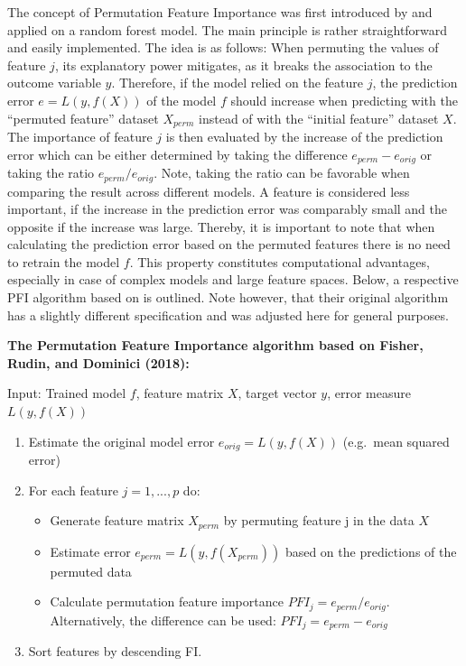 \documentclass[]{krantz}
\providecommand{\tightlist}{%
  \setlength{\itemsep}{0pt}\setlength{\parskip}{0pt}}
\begin{document}
The concept of Permutation Feature Importance was first introduced by
\citet{breiman2001random} and applied on a random forest model. The main
principle is rather straightforward and easily implemented. The idea is
as follows: When permuting the values of feature \(j\), its explanatory
power mitigates, as it breaks the association to the outcome variable
\(y\). Therefore, if the model relied on the feature \(j\), the
prediction error \(e = L(y,f(X))\) of the model \(f\) should increase
when predicting with the ``permuted feature'' dataset \(X_{perm}\)
instead of with the ``initial feature'' dataset \(X\). The importance of
feature \(j\) is then evaluated by the increase of the prediction error
which can be either determined by taking the difference
\(e_{perm} - e_{orig}\) or taking the ratio \(e_{perm}/e_{orig}\). Note,
taking the ratio can be favorable when comparing the result across
different models. A feature is considered less important, if the
increase in the prediction error was comparably small and the opposite
if the increase was large. Thereby, it is important to note that when
calculating the prediction error based on the permuted features there is
no need to retrain the model \(f\). This property constitutes
computational advantages, especially in case of complex models and large
feature spaces. Below, a respective PFI algorithm based on
\citet{fisher2018model} is outlined. Note however, that their original
algorithm has a slightly different specification and was adjusted here
for general purposes.

\textbf{The Permutation Feature Importance algorithm based on Fisher,
Rudin, and Dominici (2018):}

Input: Trained model \(f\), feature matrix \(X\), target vector \(y\),
error measure \(L(y,f(X))\)

\begin{enumerate}
\def\labelenumi{\arabic{enumi}.}
\tightlist
\item
  Estimate the original model error \(e_{orig} = L(y,f(X))\) (e.g.~mean
  squared error)
\item
  For each feature \(j = 1,...,p\) do:

  \begin{itemize}
  \tightlist
  \item
    Generate feature matrix \(X_{perm}\) by permuting feature j in the
    data \(X\)
  \item
    Estimate error \(e_{perm} = L(y,f(X_{perm}))\) based on the
    predictions of the permuted data
  \item
    Calculate permutation feature importance
    \(PFI_{j} = e_{perm}/e_{orig}\). Alternatively, the difference can
    be used: \(PFI_{j} = e_{perm} - e_{orig}\)
  \end{itemize}
\item
  Sort features by descending FI.
\end{enumerate}
\end{document}
